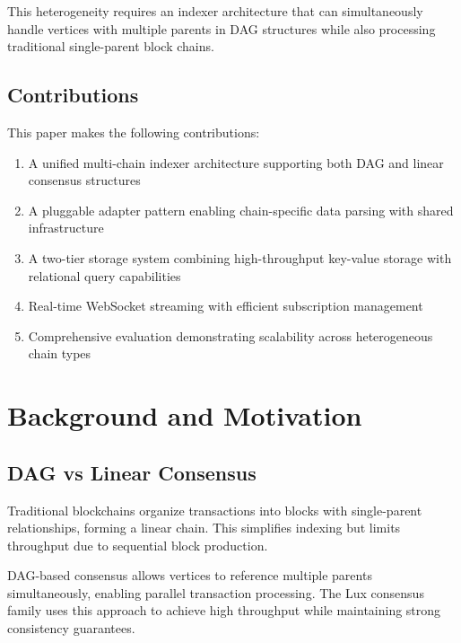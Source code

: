 \documentclass[11pt,twocolumn]{article}
\begin{document}
This heterogeneity requires an indexer architecture that can simultaneously handle vertices with multiple parents in DAG structures while also processing traditional single-parent block chains.

\subsection{Contributions}

This paper makes the following contributions:

\begin{enumerate}
\item A unified multi-chain indexer architecture supporting both DAG and linear consensus structures
\item A pluggable adapter pattern enabling chain-specific data parsing with shared infrastructure
\item A two-tier storage system combining high-throughput key-value storage with relational query capabilities
\item Real-time WebSocket streaming with efficient subscription management
\item Comprehensive evaluation demonstrating scalability across heterogeneous chain types
\end{enumerate}

\section{Background and Motivation}

\subsection{DAG vs Linear Consensus}

Traditional blockchains organize transactions into blocks with single-parent relationships, forming a linear chain. This simplifies indexing but limits throughput due to sequential block production.

DAG-based consensus allows vertices to reference multiple parents simultaneously, enabling parallel transaction processing. The Lux consensus family uses this approach to achieve high throughput while maintaining strong consistency guarantees.
\end{document}
